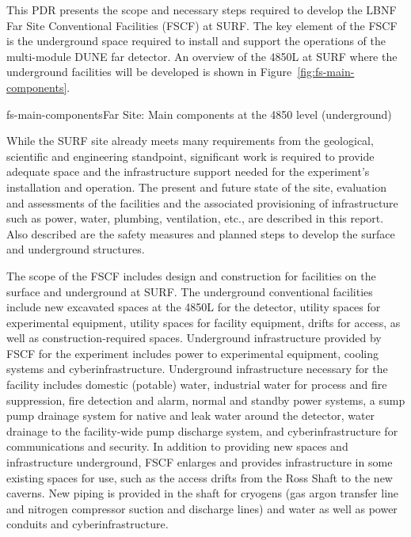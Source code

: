 This PDR presents the scope and necessary steps required to develop the LBNF Far Site Conventional Facilities (FSCF) at SURF. The key element of the FSCF is the underground space required to install and support the operations of the multi-module DUNE far detector. An overview of the 4850L at SURF where the underground facilities will be developed is shown in Figure~\ref{fig:fs-main-components}.

\begin{cdrfigure}{fs-main-components}{Far Site: Main components at the 4850 level (underground)}
\end{cdrfigure}

While the SURF site already meets many requirements from the geological, scientific and engineering standpoint, significant work is required to provide adequate space and the infrastructure support needed for the experiment's installation and operation. The present and future state of the site, evaluation and assessments of the facilities and the associated provisioning of infrastructure such as power, water, plumbing, ventilation, etc., are described in this report. Also described are the safety measures and planned steps to develop the surface and underground structures. 

The scope of the FSCF includes design and construction for facilities on the surface and underground at SURF. The underground conventional facilities include new excavated spaces at the 4850L for the detector, utility spaces for experimental equipment, utility spaces for facility equipment, drifts for access, as well as construction-required spaces. Underground infrastructure provided by FSCF for the experiment includes power to experimental equipment, cooling systems and cyberinfrastructure. Underground infrastructure necessary for the facility includes domestic (potable) water, industrial water for process and fire suppression, fire detection and alarm, normal and standby power systems, a sump pump drainage system for native and leak water around the detector, water drainage to the facility-wide pump discharge system, and cyberinfrastructure for communications and security. In addition to providing new spaces and infrastructure underground, FSCF enlarges and provides infrastructure in some existing spaces for use, such as the access drifts from the Ross Shaft to the new caverns. New piping is provided in the shaft for cryogens (gas argon transfer line and nitrogen compressor suction and discharge lines) and water as well as power conduits and cyberinfrastructure.

